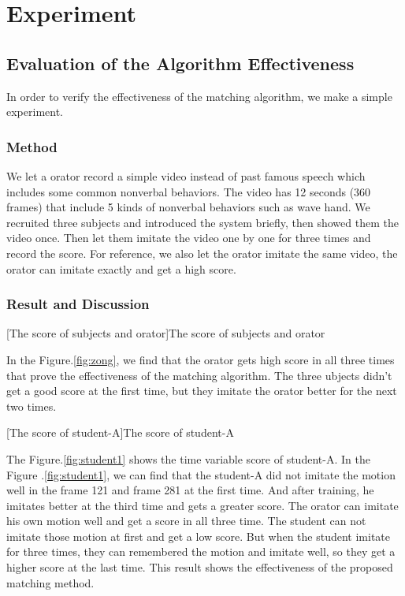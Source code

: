 \chapter{Experiment}
\section{Evaluation of the Algorithm Effectiveness}%
\label{sec:evaluation_of_the_system_effectiveness}

\par In order to verify the effectiveness of the matching algorithm, we make a simple experiment.
\subsection*{Method}
\par  We let a orator record a simple video instead of past famous speech which includes some common nonverbal behaviors. The video has 12 seconds (360 frames) that include 5 kinds of nonverbal behaviors such as wave hand. We recruited three subjects and introduced the system briefly, then showed them the video once. Then let them imitate the video one by one for three times and record the score. For reference, we also let the orator imitate the same video, the orator can imitate exactly and get a high score.

\subsection*{Result and Discussion}

[The score of subjects and orator]{The score of subjects and orator}
\par In the Figure.\ref{fig:zong}, we find that the orator gets high score in all three times that prove the effectiveness of the matching algorithm. The three ubjects didn't get a good score at the first time, but they imitate the orator better for the next two times. 

[The score of student-A]{The score of student-A}
  \par The Figure.\ref{fig:student1} shows the time variable score of student-A. In the Figure .\ref{fig:student1}, we can find that the student-A did not imitate the motion well in the frame 121 and frame 281 at the first time. And after training, he imitates better at the third time and gets a greater score. The orator can imitate his own motion well and get a score in all three time. The student can not imitate those motion at first and get a low score. But when the student imitate for three times, they can remembered the motion and imitate well, so they get a higher score at the last time. This result shows the effectiveness of the proposed matching method.

